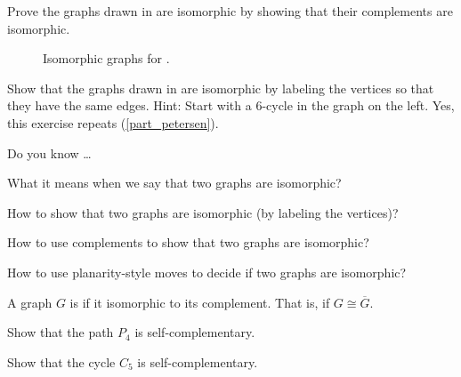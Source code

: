 \begin{exer}[\exerP] %
\label{exer_show_graph_ism_using_comp}
    Prove the graphs drawn in  are isomorphic by showing that their complements are isomorphic.     
        \begin{figure}[hbtp]
            \centering
            
            \caption{Isomorphic graphs for .}
            \label{fig_ism_H4b7}
        \end{figure}
\end{exer}

\begin{exer}[\exerU] %
\label{exer_petersen}
    Show that the graphs drawn in  are isomorphic by labeling the vertices so that they have the same edges. Hint: Start with a 6-cycle in the graph on the left.  Yes, this exercise repeats  (\ref{part_petersen}). 
\end{exer}

\begin{exer}[\exerR] %
\label{exer_dyk_ism_graphs}
    Do you know \ldots
        \begin{exerpart}
            \item What it means when we say that two graphs are isomorphic?
            \item How to show that two graphs are isomorphic (by labeling the vertices)?
            \item How to use complements to show that two graphs are isomorphic?
            \item How to use planarity-style moves to decide if two graphs are isomorphic?
        \end{exerpart}
\end{exer}

\begin{exer}[\exerE] %
\label{exer_selfcomp_graph}
    A graph $G$ is  if it isomorphic to its complement.  That is, if $G \cong \overline{G}$. 
        \begin{apart}           
            \item Show that the path $P_4$ is self-complementary. 
            \item Show that the cycle $C_5$ is self-complementary.
        \end{apart}
\end{exer}


